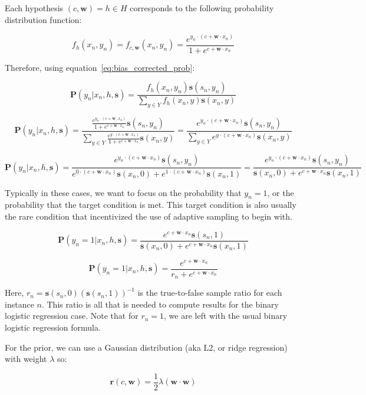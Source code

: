 \documentclass[twoside]{article}
\begin{document}
Each hypothesis \((c, \mathbf{w})=h \in H\) corresponds to the following probability distribution function:

\[f_h(x_n, y_n)=f_{c,\mathbf{w}}(x_n, y_n)=\frac{e^{y_n \cdot (c+\mathbf{w} \cdot x_n)}}{1+e^{c+\mathbf{w} \cdot x_n}}\]

Therefore, using  equation~\eqref{eq:bias_corrected_prob}:

\[\mathbf{P}(y_n|x_n,h,\mathbf{s})=\frac{f_h(x_n,y_n)\mathbf{s}(s_n,y_n)}{\sum_{y \in Y}f_h(x_n,y)\mathbf{s}(x_n,y)} \]

\[\mathbf{P}(y_n|x_n,h,\mathbf{s})=\frac{\frac{e^{y_n \cdot(c+\mathbf{w} \cdot x_n)}}{1+e^{c+\mathbf{w} \cdot x_n}}\mathbf{s}(s_n,y_n)}{\sum_{y \in Y}\frac{e^{y \cdot (c+\mathbf{w} \cdot x_n)}}{1+e^{c+\mathbf{w} \cdot x_n}}\mathbf{s}(x_n,y)} =\frac{e^{y_n \cdot (c+\mathbf{w} \cdot x_n)}\mathbf{s}(s_n,y_n)}{\sum_{y \in Y}e^{y \cdot (c+\mathbf{w} \cdot x_n)}\mathbf{s}(x_n,y)}\]

\[\mathbf{P}(y_n|x_n,h,\mathbf{s})=\frac{e^{y_n \cdot (c+\mathbf{w} \cdot x_n)}\mathbf{s}(s_n,y_n)}{e^{0 \cdot (c+\mathbf{w} \cdot x_n)}\mathbf{s}(x_n,0)+e^{1 \cdot (c+\mathbf{w} \cdot x_n)}\mathbf{s}(x_n,1)}=\frac{e^{y_n \cdot (c+\mathbf{w} \cdot x_n)}\mathbf{s}(s_n,y_n)}{\mathbf{s}(x_n,0)+e^{c+\mathbf{w} \cdot x_n}\mathbf{s}(x_n,1)} \]

Typically in these cases, we want to focus on the probability that \(y_n = 1\), or the probability that the target condition is met. This target condition is also usually the rare condition that incentivized the use of adaptive sampling to begin with.

\[\mathbf{P}(y_n=1|x_n,h,\mathbf{s})=\frac{e^{c+\mathbf{w} \cdot x_n}\mathbf{s}(s_n,1)}{\mathbf{s}(x_n,0)+e^{c+\mathbf{w} \cdot x_n}\mathbf{s}(x_n,1)} \]

\[\mathbf{P}(y_n=1|x_n,h,\mathbf{s})=\frac{e^{c+\mathbf{w} \cdot x_n}}{r_n+e^{c+\mathbf{w} \cdot x_n}} \]

Here, \(r_n = \mathbf{s}(s_n,0)(\mathbf{s}(s_n,1))^{-1}\) is the true-to-false sample ratio for each instance \(n\). This ratio is all that is needed to compute results for the binary logistic regression case. Note that for \(r_n=1\), we are left with the usual binary logistic regression formula.

For the prior, we can use a Gaussian distribution (aka L2, or ridge regression) with weight \(\lambda\) so:

\[\mathbf{r}(c,\mathbf{w})=\frac{1}{2}\lambda(\mathbf{w} \cdot \mathbf{w})\]
\end{document}

